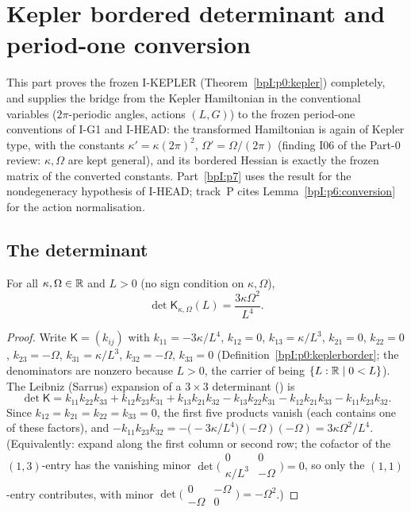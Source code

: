 \section{Kepler bordered determinant and period-one conversion}\label{bpI:p6}

This part proves the frozen I-KEPLER (Theorem~\ref{bpI:p0:kepler}) completely, and supplies the bridge from the Kepler
Hamiltonian in the conventional variables ($2\pi$-periodic angles, actions $(L,G)$) to the frozen period-one
conventions of I-G1 and I-HEAD: the transformed Hamiltonian is again of Kepler type, with the constants
$\kappa'=\kappa(2\pi)^2$, $\Omega'=\Omega/(2\pi)$ (finding I06 of the Part-0 review: $\kappa,\Omega$ are kept general),
and its bordered Hessian  is exactly the frozen matrix  of the converted constants.
Part~\ref{bpI:p7} uses the result for the nondegeneracy hypothesis of I-HEAD; track~P cites
Lemma~\ref{bpI:p6:conversion} for the action normalisation.

\subsection{The determinant}\label{bpI:p6:sec-det}

\begin{lemma}\label{bpI:p6:det-formula}
For all $\kappa,\Omega\in\mathbb{R}$ and $L>0$ (no sign condition on $\kappa,\Omega$),
\[
\det\mathsf K_{\kappa,\Omega}(L)=\frac{3\kappa\Omega^2}{L^4}.
\]
\end{lemma}
\begin{proof}
\label{stepI:p6:expand}
Write $\mathsf K=(k_{ij})$ with $k_{11}=-3\kappa/L^4$, $k_{12}=0$, $k_{13}=\kappa/L^3$, $k_{21}=0$, $k_{22}=0$, $k_{23}=-\Omega$,
$k_{31}=\kappa/L^3$, $k_{32}=-\Omega$, $k_{33}=0$ (Definition~\ref{bpI:p0:keplerborder}; the denominators are
nonzero because $L>0$, the carrier of  being $\{L:\mathbb{R}\mid0<L\}$). The Leibniz (Sarrus) expansion of a
$3\times3$ determinant () is
\[
\det\mathsf K=k_{11}k_{22}k_{33}+k_{12}k_{23}k_{31}+k_{13}k_{21}k_{32}-k_{13}k_{22}k_{31}-k_{12}k_{21}k_{33}-k_{11}k_{23}k_{32}.
\]
\label{stepI:p6:eval}
Since $k_{12}=k_{21}=k_{22}=k_{33}=0$, the first five products vanish (each contains one of these factors), and
$-k_{11}k_{23}k_{32}=-\bigl(-3\kappa/L^4\bigr)(-\Omega)(-\Omega)=3\kappa\Omega^2/L^4$.
(Equivalently: expand along the first column or second row; the cofactor of the $(1,3)$-entry has the vanishing minor
$\det\bigl(\begin{smallmatrix}0&0\\ \kappa/L^3&-\Omega\end{smallmatrix}\bigr)=0$, so only the $(1,1)$-entry contributes,
with minor $\det\bigl(\begin{smallmatrix}0&-\Omega\\-\Omega&0\end{smallmatrix}\bigr)=-\Omega^2$.)
\end{proof}

